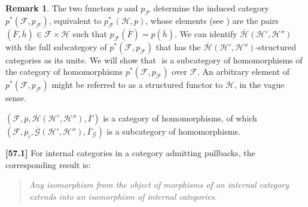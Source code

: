 \documentclass[a4paper,fleqn]{article}
\theoremstyle{plain}
\newenvironment{theorem}[1]
  {\renewcommand\theinnertheorem{#1}\innertheorem}
  {\endinnertheorem}
\theoremstyle{definition}
\newtheorem*{remark}{Remark}
\newenvironment{longcomm}[1]
  {\noindent\textbf{[#1]}\rmfamily}
  {}
\newcommand{\oldpage}[1]{{\marginpar{\footnotesize$\bigg\vert$\,\,\,\,\textit{p.~#1}}}}
\newcommand{\HH}{\mathcal{H}}
\newcommand{\bHH}{\overline{\HH}}
\newcommand{\FF}{\mathcal{F}}
\newcommand{\GG}{\mathcal{G}}
\begin{document}
\oldpage{385}
\begin{remark}
  The two functors $p$ and $p_\FF$ determine the induced category $p^*(\FF,p_\FF)$, equivalent to $p_\FF^*(\HH,p)$, whose elements (see \cite{3a}) are the pairs $(\overline{F},\overline{h})\in\FF\times\HH$ such that $p_\FF(\overline{F})=p(\overline{h})$.
  We can identify $\bHH(\HH',\HH'')$ with the full subcategory of $p^*(\FF,p_\FF)$ that has the $\bHH(\HH',\HH'')$-structured categories as its unite.
  We will show that $ $ is a subcategory of homomorphisms of the category of homomorphisms $p^*(\FF,p_\FF)$ over $\FF$.
  An arbitrary element of $p^*(\FF,p_\FF)$ might be referred to as a structured functor to $\HH$, in the vague sense.
\end{remark}

\begin{theorem}{1}
  \label{theorem:ii-1}
  $(\FF,\overline{p},\bHH(\HH',\HH''),\overline{\Gamma})$ is a category of homomorphisms, of which $(\FF,\overline{p}_\iota,\overline{\GG}(\HH',\HH''),\overline{\Gamma}_\GG)$ is a subcategory of homomorphisms.
\end{theorem}

\begin{longcomm}{57.1}
  For internal categories in a category admitting pullbacks, the corresponding result is:
  \begin{quote}
    \itshape
    Any isomorphism from the object of morphisms of an internal category extends into an isomorphism of internal categories.
  \end{quote}
\end{longcomm}
\end{document}
